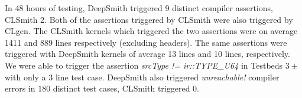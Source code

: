 In 48 hours of testing, DeepSmith triggered 9 distinct compiler assertions, CLSmith 2. Both of the assertions triggered by CLSmith were also triggered by CLgen.
%
%
%
The CLSmith kernels which triggered the two assertions were on average 1411 and 889 lines respectively (excluding headers). The same assertions were triggered with DeepSmith kernels of average 13 lines and 10 lines, respectively. 
%
We were able to trigger the assertion \emph{srcType != ir::TYPE\_U64} in Testbeds $3\pm$ with only a 3 line test case.
%
DeepSmith also triggered \emph{unreachable!} compiler errors in 180 distinct test cases, CLSmith triggered 0.



